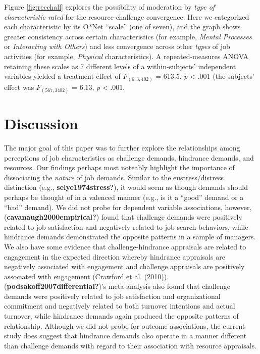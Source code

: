 \documentclass[
  man]{apa6}
\begin{document}
Figure \ref{fig:recchall} explores the possibility of moderation by \emph{type of characteristic rated} for the resource-challenge convergence. Here we categorized each characteristic by its O*Net ``scale'' (one of seven), and the graph shows greater consistency across certain characteristics (for example, \emph{Mental Processes} or \emph{Interacting with Others}) and less convergence across other \emph{types} of job activities (for example, \emph{Physical} characteristics). A repeated-measures ANOVA retaining these scales as 7 different levels of a within-subjects' independent variables yielded a treatment effect of \(F_{(6, 3,402)}\) = 613.5, \emph{p} \textless{} .001 (the subjects' effect was \(F_{(567, 3402)}\) = 6.13, \emph{p} \textless{} .001.

\hypertarget{discussion}{%
\section{Discussion}\label{discussion}}

The major goal of this paper was to further explore the relationships among perceptions of job characteristics as challenge demands, hindrance demands, and resources. Our findings perhaps most noteably highlight the importance of dissociating the \emph{nature} of job demands. Similar to the eustress/distress distinction (e.g., \textbf{selye1974stress?}), it would seem as though demands should perhaps be thought of in a valenced manner (e.g., is it a ``good'' demand or a ``bad'' demand). We did not probe for dependent variable associations, however, (\textbf{cavanaugh2000empirical?}) found that challenge demands were positively related to job satisfaction and negatively related to job search behaviors, while hindrance demands demonstrated the opposite patterns in a sample of managers. We also have some evidence that challenge-hindrance appraisals are related to engagement in the expected direction whereby hindrance appraisals are negatively associated with engagement and challenge appraisals are positively associated with engagement (Crawford et al. (2010)). (\textbf{podsakoff2007differential?})'s meta-analysis also found that challenge demands were positively related to job satisfaction and organizational commitment and negatively related to both turnover intentions and actual turnover, while hindrance demands again produced the opposite patterns of relationship. Although we did not probe for outcome associations, the current study does suggest that hindrance demands also operate in a manner different than challenge demands with regard to their association with resource appraisals.
\end{document}
